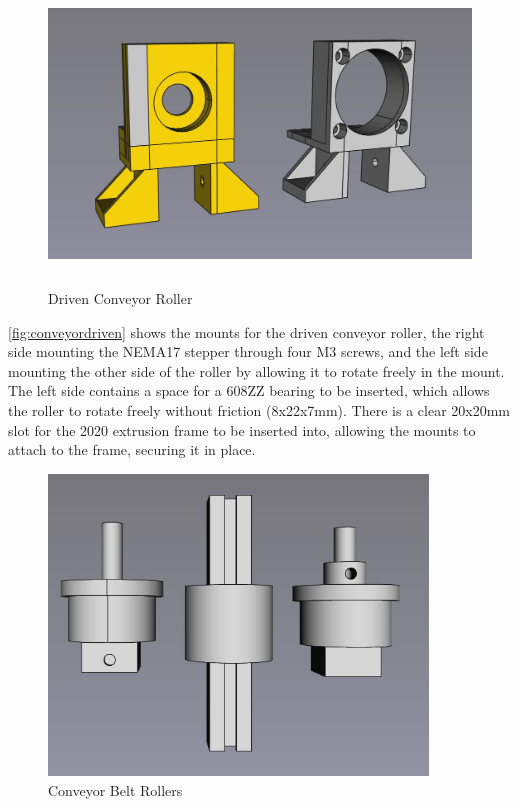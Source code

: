\begin{figure}[H]
    \begin{minipage}[h]{0.95\textwidth}
        \centering
        \includegraphics[height=8cm]{imgs/freecad/conveyor_driven.jpg}
        \caption{Driven Conveyor Roller}
        \label{fig:conveyordriven}
    \end{minipage}
\end{figure}

\autoref{fig:conveyordriven} shows the mounts for the driven conveyor roller, the right side mounting the NEMA17 stepper through four M3 screws, and the left side mounting the other side of the roller by allowing it to rotate freely in the mount. The left side contains a space for a 608ZZ bearing to be inserted, which allows the roller to rotate freely without friction (8x22x7mm). There is a clear 20x20mm slot for the 2020 extrusion frame to be inserted into, allowing the mounts to attach to the frame, securing it in place. 

\begin{figure}[H]
    \begin{minipage}[h]{0.95\textwidth}
        \centering
        \includegraphics[height=8cm]{imgs/freecad/rollers.jpg}
        \caption{Conveyor Belt Rollers}
        \label{fig:conveyorrollers}
    \end{minipage}
\end{figure}

